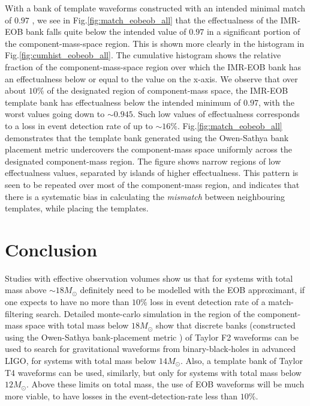 \documentclass[aps,
prd,
amsmath,
amssymb,
twocolumn,
floatfix,
groupedaddress]{revtex4-1}
\begin{document}
With a bank of template waveforms constructed with an intended minimal match of $0.97$ \citep{BabaketalBankPlacement,SathyaBankPlacementTauN}, we see in Fig.\ref{fig:match_eobeob_all} that the effectualness of the IMR-EOB bank falls quite below the intended value of $0.97$ in a significant portion of the component-mass-space region. This is shown more clearly in the histogram in Fig.\ref{fig:cumhist_eobeob_all}. The cumulative histogram shows the relative fraction of the component-mass-space region over which the IMR-EOB bank has an effectualness below or equal to the value on the x-axis. We observe that over about $10\%$ of the designated region of component-mass space, the IMR-EOB template bank has effectualness below the intended minimum of $0.97$, with the worst values going down to $\sim0.945$. Such low values of effectualness corresponds to a loss in event detection rate of up to $\sim16\%$. Fig.\ref{fig:match_eobeob_all} demonstrates that the template bank generated using the Owen-Sathya bank 
placement metric \citep{OwenTemplateSpacing,SathyaBankPlacementTauN,SathyaMetric2PN,BabaketalBankPlacement} undercovers the component-mass space uniformly across the designated component-mass region. The figure shows narrow regions of low effectualness values, separated by islands of higher effectualness. This pattern is seen to be repeated over most of the component-mass region, and indicates that there is a systematic bias in calculating the \textit{mismatch} between neighbouring templates, while placing the templates.

\section{Conclusion}\label{sec:level1:conclusion}
Studies with effective observation volumes show us that for systems with total mass above $\sim18M_{\odot}$ definitely need to be modelled with the EOB approximant, if one expects to have no more than $10\%$ loss in event detection rate of a match-filtering search. Detailed monte-carlo simulation in the region of the component-mass space with total mass below $18M_{\odot}$ show that discrete banks (constructed using the Owen-Sathya bank-placement metric \citep{SathyaMetric2PN}) of Taylor F2 waveforms can be used to search for gravitational waveforms from binary-black-holes in advanced LIGO, for systems with total mass below $14M_{\odot}$. Also, a template bank of Taylor T4 waveforms can be used, similarly, but only for systems with total mass below $12M_{\odot}$. Above these limits on total mass, the use of EOB waveforms will be much more viable, to have losses in the event-detection-rate less than $10\%$.
\end{document}
